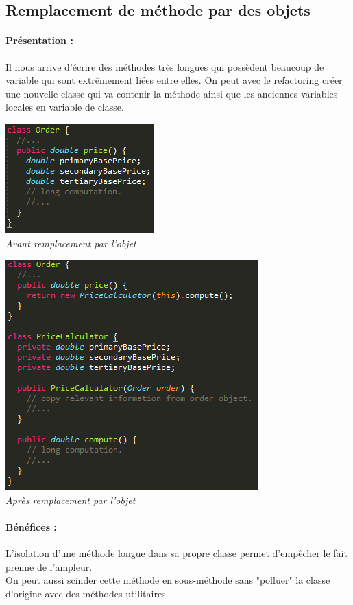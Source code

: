 \documentclass[a4paper,twoside,12pt,openright]{report}
\begin{document}
\subsection{Remplacement de méthode par des objets}
\paragraph{Présentation :}
Il nous arrive d'écrire des méthodes très longues qui possèdent beaucoup de variable qui sont extrêmement liées entre elles. On peut avec le refactoring créer une nouvelle classe qui va contenir la méthode ainsi que les anciennes variables locales en variable de classe.

\begin{center}
\includegraphics[scale=1]{Image/MethodeToObjet.png}\\
\itshape{Avant remplacement par l'objet \cite{ref5}}
\end{center}

\begin{center}
\includegraphics[scale=1]{Image/MethodeToObjet2.png}\\
\itshape{Après remplacement par l'objet \cite{ref5}}
\end{center}

\paragraph{Bénéfices :}
L'isolation d'une méthode longue dans sa propre classe permet d'empêcher le fait prenne de l'ampleur.\\
On peut aussi scinder cette méthode en sous-méthode sans "polluer" la classe d'origine avec des méthodes utilitaires.
\end{document}
